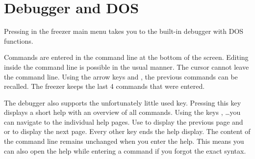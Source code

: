 \chapter{Debugger and DOS}
\label{chap:debugger}
Pressing  in the freezer main menu takes you to the built-in debugger
with DOS functions.

Commands are entered in the command line at the bottom of the screen. Editing
inside the command line is possible in the usual manner. The cursor cannot leave
the command line. Using the arrow keys  and  ,
the previous commands can be recalled. The freezer keeps the last 4 commands
that were entered.

The debugger also supports the unfortunately little used  key.
Pressing this key displays a short help with an overview of all commands.
Using the keys , \dots you can navigate to the individual help
pages. Use  to display the previous page and  or
 to display the next page. Every other key ends the help display.
The content of the command line remains unchanged when you enter the help.
This means you can also open the help while entering a command if you
forgot the exact syntax.

